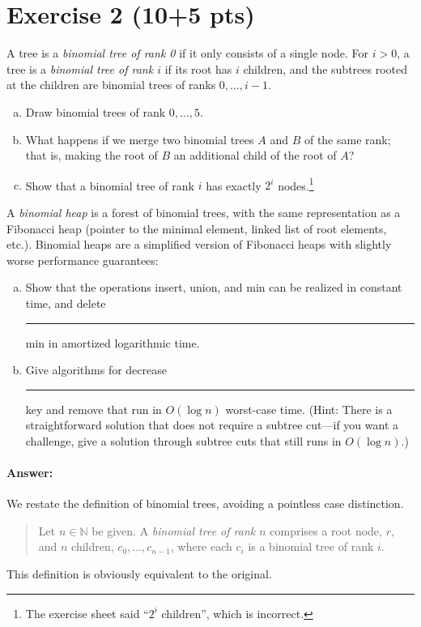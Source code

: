 \documentclass[a4paper]{article}
\newcommand{\any}{{\rule[-.2ex]{1ex}{.4pt}}}	%
\newcommand{\NN}{\mathbb{N}}
\begin{document}
\section{Exercise 2 (10+5 pts)}

A tree is a \emph{binomial tree of rank 0} if it only consists of a single node.
For $i>0$, a tree is a \emph{binomial tree of rank $i$} if its root has $i$ children, and the subtrees rooted at the children are binomial trees of ranks $0, \ldots, i-1$.

\begin{enumerate}[a)]
\item Draw binomial trees of rank $0, \ldots, 5$.
\item What happens if we merge two binomial trees $A$ and $B$ of the same rank; that is, making the root of $B$ an additional child of the root of $A$?
\item Show that a binomial tree of rank $i$ has exactly $2^i$ nodes.\footnote{%
	The exercise sheet said ``$2^i$ children'', which is incorrect.
}
\end{enumerate}

A \emph{binomial heap} is a forest of binomial trees, with the same representation as a Fibonacci heap (pointer to the minimal element, linked list of root elements, etc.).
Binomial heaps are a simplified version of Fibonacci heaps with slightly worse performance guarantees:
\begin{enumerate}[a), resume]
\item Show that the operations insert, union, and min can be realized in constant time, and delete\any{}min in amortized logarithmic time.
\item Give algorithms for decrease\any{}key and remove that run in $O(\log n)$ worst-case time.
(Hint: There is a straightforward solution that does not require a subtree cut---if you want a challenge, give a solution through subtree cuts that still runs in $O(\log n)$.)
\end{enumerate}

\paragraph{Answer:}
We restate the definition of binomial trees, avoiding a pointless case distinction.
\begin{quote}
Let $n\in\NN$ be given.
A \emph{binomial tree of rank $n$} comprises a root node, $r$, and $n$ children, $c_0, \ldots, c_{n-1}$, where each $c_i$ is a binomial tree of rank $i$.
\end{quote}
This definition is obviously equivalent to the original.
\end{document}
